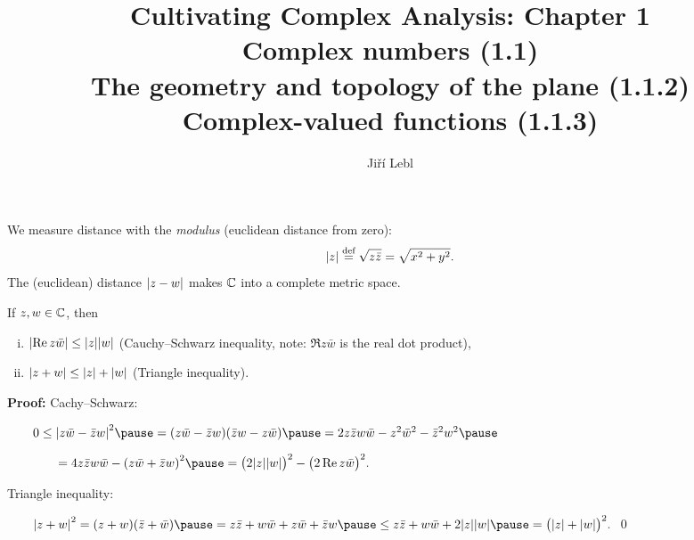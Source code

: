 \documentclass[10pt,aspectratio=169]{beamer}
\author{Ji\v{r}\'i Lebl}
\institute[OSU]{%
Departemento pri Matematiko de Oklahoma {\^S}tata Universitato}
\title{Cultivating Complex Analysis: Chapter 1\\Complex numbers (1.1)\\%
The geometry and topology of the plane (1.1.2)\\%
Complex-valued functions (1.1.3)}
\date{}
\begin{document}
\begin{frame}
\titlepage
\end{frame}

\begin{frame}
We measure distance with the \emph{modulus} (euclidean distance from zero):
\[
\lvert {z} \rvert \overset{\text{def}}{=} \sqrt{z \bar{z}} = \sqrt{x^2+y^2} .
\]
\pause
The (euclidean) distance 
\(
\lvert {z-w} \rvert
\)
makes ${\mathbb{C}}$ into a complete metric space.

\medskip
\pause

%
%
%
%
\begin{proposition}
If $z,w \in {\mathbb{C}}$, then
\begin{enumerate}[(i)]
\item
$\lvert {\operatorname{Re}z\bar{w}} \rvert \leq \lvert {z} \rvert \lvert {w} \rvert$ \quad (Cauchy--Schwarz inequality, note: $\Re z
\bar{w}$ is the real dot product),
\item
$\lvert {z+w} \rvert \leq \lvert {z} \rvert + \lvert {w} \rvert$ \quad (Triangle inequality).%
\end{enumerate}
\end{proposition}

\textbf{Proof:}
Cachy--Schwarz:

\medskip

\(
\qquad
0  \leq {\sabs{z\bar{w}-\bar{z}w}}^2 \pause
   =    (z\bar{w}-\bar{z}w)(\bar{z}w-z\bar{w})  \pause
   =    2z\bar{z}w\bar{w} - z^2\bar{w}^2 - \bar{z}^2w^2 \pause
\)

\( \qquad \qquad
   =    4z\bar{z}w\bar{w} - {(z\bar{w}+\bar{z}w)}^2 \pause
   =    {\bigl(2\sabs{z}\sabs{w}\bigr)}^2 - {\bigl(2 \Re z\bar{w}\bigr)}^2 .
\)

\medskip
\pause

Triangle inequality:

\medskip
\(
\qquad
{\sabs{z+w}}^2  =    (z+w)(\bar{z}+\bar{w}) \pause
                =    z\bar{z} + w\bar{w} + z\bar{w} + \bar{z}w \pause
                \leq z\bar{z} + w\bar{w} + 2 \sabs{z}\sabs{w} \pause
                =    {\bigl(\sabs{z}+\sabs{w}\bigr)}^2 .
\) \qed

\end{frame}
\end{document}
